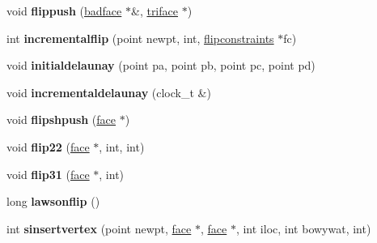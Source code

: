 \begin{DoxyCompactItemize}
\item 
\hypertarget{classtetgenmesh_a5ffeb14717bdf9867aa29a9d9487013f}{void {\bfseries flippush} (\hyperlink{classtetgenmesh_1_1badface}{badface} $\ast$\&, \hyperlink{classtetgenmesh_1_1triface}{triface} $\ast$)}\label{classtetgenmesh_a5ffeb14717bdf9867aa29a9d9487013f}

\item 
\hypertarget{classtetgenmesh_a2388d9669cc9bb2a68943633bd5148ef}{int {\bfseries incrementalflip} (point newpt, int, \hyperlink{classtetgenmesh_1_1flipconstraints}{flipconstraints} $\ast$fc)}\label{classtetgenmesh_a2388d9669cc9bb2a68943633bd5148ef}

\item 
\hypertarget{classtetgenmesh_a9b2f957a884b39c4d93c8695fa4b59d7}{void {\bfseries initialdelaunay} (point pa, point pb, point pc, point pd)}\label{classtetgenmesh_a9b2f957a884b39c4d93c8695fa4b59d7}

\item 
\hypertarget{classtetgenmesh_a5a5a0513d0bea7aa457eb0bc5fad1b02}{void {\bfseries incrementaldelaunay} (clock\-\_\-t \&)}\label{classtetgenmesh_a5a5a0513d0bea7aa457eb0bc5fad1b02}

\item 
\hypertarget{classtetgenmesh_a5a83480cb33ea6ceebb125e20d33c324}{void {\bfseries flipshpush} (\hyperlink{classtetgenmesh_1_1face}{face} $\ast$)}\label{classtetgenmesh_a5a83480cb33ea6ceebb125e20d33c324}

\item 
\hypertarget{classtetgenmesh_ac34f0cd148accd132b491f9c6145c6f6}{void {\bfseries flip22} (\hyperlink{classtetgenmesh_1_1face}{face} $\ast$, int, int)}\label{classtetgenmesh_ac34f0cd148accd132b491f9c6145c6f6}

\item 
\hypertarget{classtetgenmesh_a3db30cb237ac5cbcda3ac70a1ea31666}{void {\bfseries flip31} (\hyperlink{classtetgenmesh_1_1face}{face} $\ast$, int)}\label{classtetgenmesh_a3db30cb237ac5cbcda3ac70a1ea31666}

\item 
\hypertarget{classtetgenmesh_acf60f3a43f8b907d95623b42a88ae968}{long {\bfseries lawsonflip} ()}\label{classtetgenmesh_acf60f3a43f8b907d95623b42a88ae968}

\item 
\hypertarget{classtetgenmesh_ad48cec74c7fbcf66ebd312661da5d0bc}{int {\bfseries sinsertvertex} (point newpt, \hyperlink{classtetgenmesh_1_1face}{face} $\ast$, \hyperlink{classtetgenmesh_1_1face}{face} $\ast$, int iloc, int bowywat, int)}\label{classtetgenmesh_ad48cec74c7fbcf66ebd312661da5d0bc}


\end{DoxyCompactItemize}
